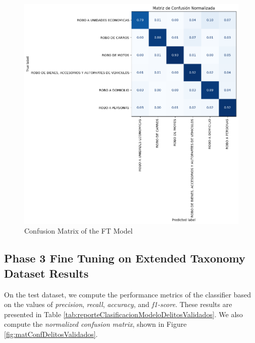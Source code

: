 \documentclass[onecolumn, journal, english, 12pt, a4paper]{IEEEtran} %
\theoremstyle{definition}
\begin{document}
\begin{figure}[!t]
    \centering
    \includegraphics[width=.8\textwidth]{imgs/FineTuning10_epochs.png}
    \caption{Confusion Matrix of the FT Model}
    \label{fig:matconfusion}
  \end{figure}
  
\subsection{Phase 3 Fine Tuning on Extended Taxonomy Dataset Results}
\label{sec:phase-3-extended-dataset-results-ft}

On the test dataset, we compute the performance metrics of the
classifier based on the values of \emph{precision}, \emph{recall},
\emph{accuracy}, and \emph{f1-score}. These results are presented in
Table \ref{tab:reporteClasificacionModeloDelitosValidados}. We also
compute the \emph{normalized confusion matrix}, shown in Figure
\ref{fig:matConfDelitosValidados}.
\end{document}
